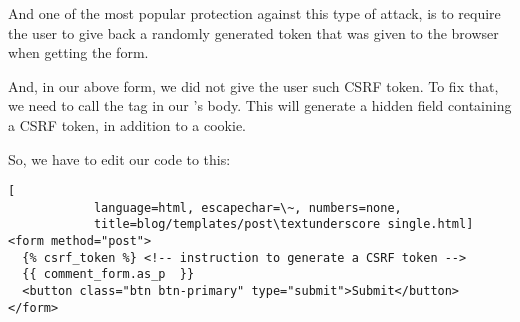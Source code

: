         And one of the most popular protection against this type of attack, is to require the user to 
        give back a randomly generated token that was given to the browser when getting the form.
        
        And, in our above form, we did not give the user such CSRF token. To fix that, we need
        to call the tag  in our 's body. 
        This will generate a hidden  field containing a CSRF token, 
        in addition to a cookie.
        
        So, we have to edit our code to this:
        \begin{lstlisting}[
            language=html, escapechar=\~, numbers=none, 
            title=blog/templates/post\textunderscore single.html]
<form method="post">
  {% csrf_token %} <!-- instruction to generate a CSRF token -->
  {{ comment_form.as_p  }}
  <button class="btn btn-primary" type="submit">Submit</button>
</form>
        \end{lstlisting}

